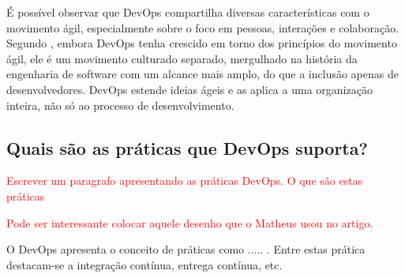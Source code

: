 \documentclass[twoside,english,brazilian]{UNISINOSartigo}
\begin{document}
É possível observar que DevOps compartilha diversas características com o movimento ágil, especialmente sobre o foco em pessoas, interações e colaboração. Segundo \citep{Fallis2013}, embora DevOps tenha crescido em torno dos princípios do movimento ágil, ele é um movimento culturado separado, mergulhado na história da engenharia de software com um alcance mais amplo, do que a inclusão apenas de desenvolvedores. DevOps estende ideias ágeis e as aplica a uma organização inteira, não só ao processo de desenvolvimento.  
\subsection{Quais são as práticas que DevOps suporta? }

\textcolor{red}{Escrever um paragrafo apresentando as práticas DevOps. O que são estas práticas}

\textcolor{red}{Pode ser interessante colocar aquele desenho que o Matheus usou no artigo.}

O DevOps apresenta o conceito de práticas como ..... . Entre estas prática destacam-se a integração contínua, entrega contínua, etc.
\end{document}

